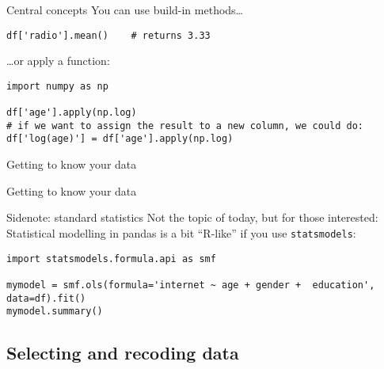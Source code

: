 \begin{frame}[fragile]{Central concepts}
You can use build-in methods\ldots

\begin{verbatim}
df['radio'].mean()    # returns 3.33
\end{verbatim}

\ldots or apply a function:

\begin{verbatim}
import numpy as np

df['age'].apply(np.log)
# if we want to assign the result to a new column, we could do:
df['log(age)'] = df['age'].apply(np.log)
\end{verbatim}


\end{frame}

\begin{frame}[fragile]{Getting to know your data}
\end{frame}


\begin{frame}[fragile]{Getting to know your data}
\end{frame}






\begin{frame}[fragile]{Sidenote: standard statistics}
Not the topic of today, but for those interested: Statistical modelling in pandas is a bit ``R-like'' if you use \texttt{statsmodels}:

\begin{verbatim}
import statsmodels.formula.api as smf

mymodel = smf.ols(formula='internet ~ age + gender +  education', data=df).fit()
mymodel.summary()
\end{verbatim}    



\end{frame}










\subsection{Selecting and recoding data}




